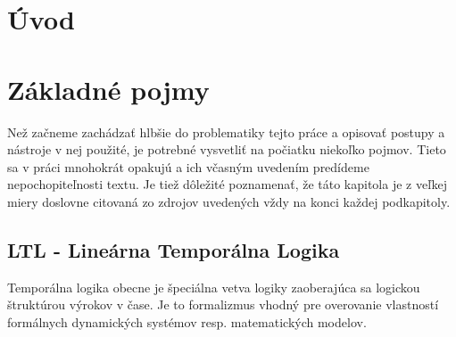\documentclass[11pt,final,oneside]{fithesis}
\begin{document}
\FrontMatter
\ThesisTitlePage


\begin{ThesisDeclaration}
\DeclarationText
\AdvisorName
\end{ThesisDeclaration}

\begin{ThesisThanks}
\end{ThesisThanks}

\begin{ThesisAbstract}
\end{ThesisAbstract}

\begin{ThesisKeyWords}
\end{ThesisKeyWords}

\MainMatter
\tableofcontents
\chapter*{\' Uvod}

\chapter{Z\' akladn\' e pojmy}
Ne\v z za\v cneme zach\' adza\v t hlb\v sie do problematiky tejto pr\' ace a opisova\v t postupy a n\' astroje v nej pou\v zit\' e, 
je potrebn\' e vysvetli\v t na po\v ciatku nieko\v lko pojmov. Tieto sa v pr\' aci mnohokr\' at opakuj\' u a ich v\v casn\' ym uveden\' im
pred\' ideme nepochopite\v lnosti textu. Je tie\v z d\^ ole\v zit\'e poznamena\v t, \v ze t\'ato kapitola je z ve\v lkej miery doslovne citovan\'a
zo zdrojov uveden\'ych v\v zdy na konci ka\v zdej podkapitoly.

\section{LTL - Line\' arna Tempor\' alna Logika}
\label{sec:logika}
Tempor\' alna logika obecne je \v speci\' alna vetva logiky zaoberaj\' uca sa logickou \v strukt\' urou v\' yrokov v \v case. 
Je to formalizmus vhodn\' y pre overovanie vlastnost\' i form\' alnych dynamick\' ych syst\' emov resp. matematick\' ych modelov.
\end{document}

